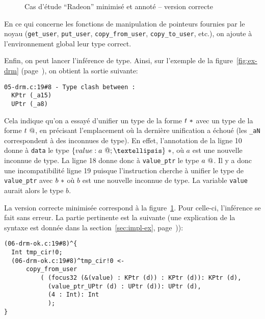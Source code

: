 \begin{figure}[p]

\begin{minipage}{1cm}
\end{minipage}
\begin{minipage}{0.93\linewidth}
\end{minipage}

    \caption{Cas d'étude \enquote{Radeon} minimisé et annoté -- version correcte}
    \label{fig:ex-drm-ok}

\end{figure}

En ce qui concerne les fonctions de manipulation de pointeurs fournies
par le noyau (\texttt{get\_user}, \texttt{put\_user},
\texttt{copy\_from\_user}, \texttt{copy\_to\_user}, etc.), on ajoute à
l'environnement global leur type correct.

Enfin, on peut lancer l'inférence de type. Ainsi, sur l'exemple de la
figure~\ref{fig:ex-drm} (page~\pageref{fig:ex-drm}), on obtient la sortie
suivante:

\begin{Verbatim}
05-drm.c:19#8 - Type clash between :
  KPtr (_a15)
  UPtr (_a8)
\end{Verbatim}

Cela indique qu'on a essayé d'unifier un type de la forme $t~*$ avec un
type de la forme $t~@$, en précisant l'emplacement où la dernière
unification a échoué (les \texttt{\_aN} correspondent à des inconnues de type).
En effet, l'annotation de la ligne 10 donne à \texttt{data} le type
$\ptrK{\tStruct{value: \ptrU{a}; …}}$, où $a$ est une nouvelle inconnue de type.
La ligne 18 donne donc à \texttt{value\_ptr} le type $a~@$. Il y a donc une
incompatibilité ligne 19 puisque l'instruction cherche à unifier
le type de \texttt{value\_ptr} avec $b~*$ où $b$ est une nouvelle inconnue
de type. La variable \texttt{value} aurait alors le type $b$.

La version correcte minimisée correspond à la figure~\ref{fig:ex-drm-ok}. Pour
celle-ci, l'inférence se fait sans erreur. La partie pertinente est la suivante
(une explication de la syntaxe est donnée dans la section~\ref{sec:impl-ex},
page~\pageref{sec:impl-ex})):

\begin{Verbatim}
(06-drm-ok.c:19#8)^{
  Int tmp_cir!0;
  (06-drm-ok.c:19#8)^tmp_cir!0 <-
      copy_from_user
          ( (focus32 (&(value) : KPtr (d)) : KPtr (d)): KPtr (d),
            (value_ptr_UPtr (d) : UPtr (d)): UPtr (d),
            (4 : Int): Int
            );
}
\end{Verbatim}

